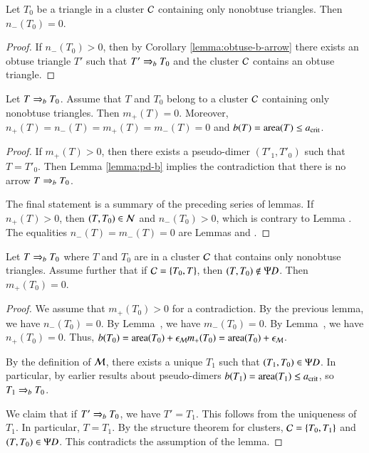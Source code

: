 \begin{lemma} 
  Let $T_0$ be a triangle in a cluster $\mathcal C$ containing only nonobtuse
  triangles.  Then $n_-(T_0)=0$.
\end{lemma}

\begin{proof} 
  If $n_-(T_0)>0$, then by Corollary \ref{lemma:obtuse-b-arrow} there
  exists an obtuse triangle $T'$ such that $T'\Rightarrow_{b} T_0$ and the
  cluster $\mathcal C$ contains an obtuse triangle.
\end{proof}

\begin{lemma} 
  Let $T\Rightarrow_{b} T_0$. Assume that $T$ and $T_0$ belong to a cluster $\mathcal C$
 containing only  nonobtuse triangles.  Then
  $m_+(T)=0$.  Moreover, $n_+(T)=n_-(T)=m_+(T)=m_-(T)=0$ and
  $b(T)={\operatorname{area}}(T)\le a_\text{crit}$.
\end{lemma}

\begin{proof}
  If $m_+(T)>0$, then there exists a pseudo-dimer $(T'_1,T'_0)$ such
  that $T=T'_0$.  Then Lemma \ref{lemma:pd-b} implies the
  contradiction that there is no arrow $T\Rightarrow_{b} T_0$.

  The final statement is a summary of the preceding series of lemmas.
   If $n_+(T)>0$, then $(T,T_0)\in\mathcal N$ and $n_-(T_0)>0$, which is contrary
  to Lemma .    The equalities $n_-(T)=m_-(T)=0$ are
  Lemmas  and .
\end{proof}


\begin{lemma}  
  Let $T\Rightarrow_{b} T_0$ where $T$ and $T_0$ are in a cluster $\mathcal C$ that
  contains only nonobtuse triangles.  Assume further that if
  $\mathcal C=\{T_0,T\}$, then $(T,T_0)\not\in\Psi D$.  Then $m_+(T_0)=0$.
\end{lemma}

\begin{proof}  
  We assume that $m_+(T_0)>0$ for a contradiction.  By the previous
  lemma, we have $n_-(T_0)=0$.  By Lemma~, we have
  $m_-(T_0)=0$.  By Lemma~, we have $n_+(T_0)=0$.
  Thus, $b(T_0) = {\operatorname{area}}(T_0) + \epsilon_{\mathcal M} m_+(T_0) = {\operatorname{area}}(T_0)+\epsilon_{\mathcal M}$.

  By the definition of $\mathcal M$, there exists a unique $T_1$ such that
  $(T_1,T_0)\in \Psi D$.  In particular, by earlier results about
  pseudo-dimers $b(T_1)={\operatorname{area}}(T_1)\le a_\text{crit}$, so $T_1\Rightarrow_{b} T_0$.

  We claim that if $T'\Rightarrow_{b} T_0$, we have $T'=T_1$.  This follows from
  the uniqueness of $T_1$.  In particular, $T=T_1$.  By the structure
  theorem for clusters, $\mathcal C = \{T_0,T_1\}$ and $(T,T_0)\in\Psi D$.  This
  contradicts the assumption of the lemma.
\end{proof}

